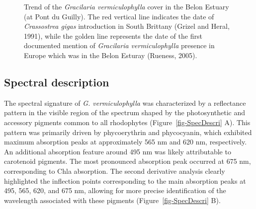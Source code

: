 \documentclass[
  letterpaper,
  11pt,
  english,
  singlespacing,
  headsepline]{MastersDoctoralThesis}
\begin{document}
\begin{spacing}{1.5}
\begin{landscape}
\end{landscape}

\newpage

\begin{figure}


\caption{\label{fig-HistoricalPlot_g}Trend of the \emph{Gracilaria
vermiculophylla} cover in the Belon Estuary (at Pont du Guilly). The red
vertical line indicates the date of \emph{Crassostrea gigas}
introduction in South Brittany (Grizel and Heral, 1991), while the
golden line represents the date of the first documented mention of
\emph{Gracilaria vermiculophylla} presence in Europe which was in the
Belon Esturay (Rueness, 2005).}

\end{figure}%

\subsection{Spectral description}\label{spectral-description}

The spectral signature of \emph{G. vermiculophylla} was characterized by
a reflectance pattern in the visible region of the spectrum shaped by
the photosynthetic and accessory pigments common to all rhodophytes
(Figure~\ref{fig-SpecDescri} A). This pattern was primarily driven by
phycoerythrin and phycocyanin, which exhibited maximum absorption peaks
at approximately 565 nm and 620 nm, respectively. An additional
absorption feature around 495 nm was likely attributable to carotenoid
pigments. The most pronounced absorption peak occurred at 675 nm,
corresponding to Chla absorption. The second derivative analysis clearly
highlighted the inflection points corresponding to the main absorption
peaks at 495, 565, 620, and 675 nm, allowing for more precise
identification of the wavelength associated with these pigments
(Figure~\ref{fig-SpecDescri} B).


\end{spacing}
\end{document}
